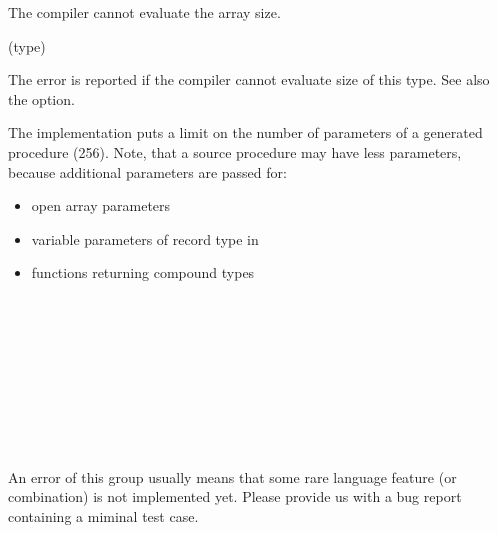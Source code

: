 
The compiler cannot evaluate the array size.

(type)

The error is reported if the compiler cannot evaluate size of this type.
See also the  option.


The implementation puts a limit on the number of parameters of a generated
procedure (256). Note, that a source procedure may have less parameters,
because additional parameters are passed for:
\begin{itemize}
\item open array parameters
\item variable parameters of record type in \ot{}
\item functions returning compound types
\end{itemize}

                      \ifonline\else\\\fi
{}               \ifonline\else\\\fi
{}                 \ifonline\else\\\fi
{}                       \ifonline\else\\\fi
{}                       \ifonline\else\\\fi
{}  \ifonline\else\\\fi
{}                 \ifonline\else\\\fi
{}                \ifonline\else\\\fi
{}

An error of this group usually means that some rare language feature
(or combination) is not implemented yet. Please provide us with a bug report
containing a miminal test case.
\fi %
